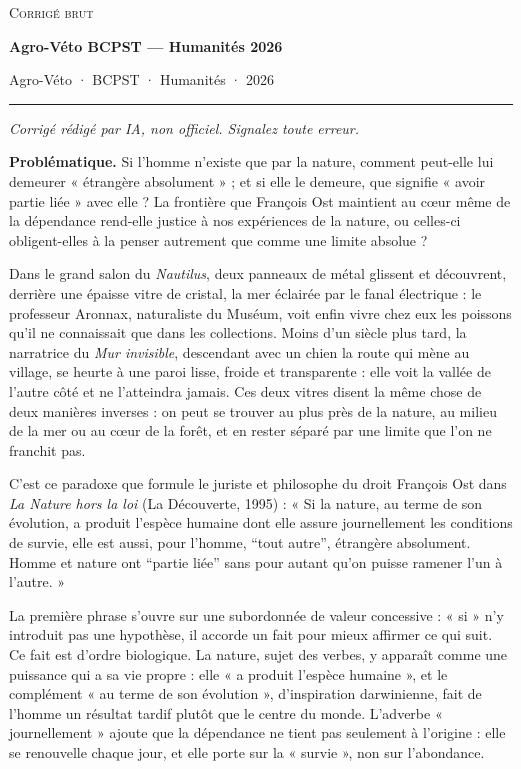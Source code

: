 \documentclass[11pt,a4paper]{article}
\begin{document}
\thispagestyle{plain}
\begin{center}
  {\small\scshape Corrigé brut}\par\smallskip
  {\LARGE\bfseries Agro-Véto BCPST — Humanités 2026\par}\medskip
  {\large Agro-Véto · BCPST · Humanités · 2026\par}
\end{center}
\vspace{2pt}\hrule\vspace{8pt}

\emph{Corrigé rédigé par IA, non officiel. Signalez toute erreur.}

\textbf{Problématique.} Si l'homme n'existe que par la nature, comment peut-elle lui demeurer « étrangère absolument » ; et si elle le demeure, que signifie « avoir partie liée » avec elle ? La frontière que François Ost maintient au cœur même de la dépendance rend-elle justice à nos expériences de la nature, ou celles-ci obligent-elles à la penser autrement que comme une limite absolue ?

Dans le grand salon du \emph{Nautilus}, deux panneaux de métal glissent et découvrent, derrière une épaisse vitre de cristal, la mer éclairée par le fanal électrique : le professeur Aronnax, naturaliste du Muséum, voit enfin vivre chez eux les poissons qu'il ne connaissait que dans les collections. Moins d'un siècle plus tard, la narratrice du \emph{Mur invisible}, descendant avec un chien la route qui mène au village, se heurte à une paroi lisse, froide et transparente : elle voit la vallée de l'autre côté et ne l'atteindra jamais. Ces deux vitres disent la même chose de deux manières inverses : on peut se trouver au plus près de la nature, au milieu de la mer ou au cœur de la forêt, et en rester séparé par une limite que l'on ne franchit pas.

C'est ce paradoxe que formule le juriste et philosophe du droit François Ost dans \emph{La Nature hors la loi} (La Découverte, 1995) : « Si la nature, au terme de son évolution, a produit l'espèce humaine dont elle assure journellement les conditions de survie, elle est aussi, pour l'homme, ``tout autre'', étrangère absolument. Homme et nature ont ``partie liée'' sans pour autant qu'on puisse ramener l'un à l'autre. »

La première phrase s'ouvre sur une subordonnée de valeur concessive : « si » n'y introduit pas une hypothèse, il accorde un fait pour mieux affirmer ce qui suit. Ce fait est d'ordre biologique. La nature, sujet des verbes, y apparaît comme une puissance qui a sa vie propre : elle « a produit l'espèce humaine », et le complément « au terme de son évolution », d'inspiration darwinienne, fait de l'homme un résultat tardif plutôt que le centre du monde. L'adverbe « journellement » ajoute que la dépendance ne tient pas seulement à l'origine : elle se renouvelle chaque jour, et elle porte sur la « survie », non sur l'abondance.
\end{document}
